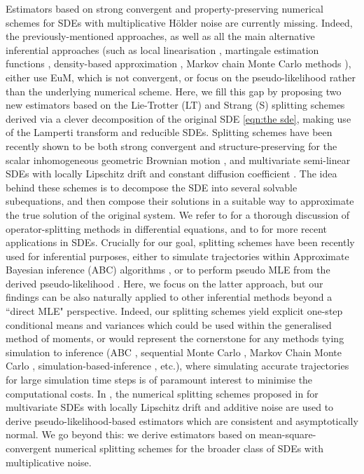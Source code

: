 \documentclass[a4paper,12pt]{article}
\numberwithin{equation}{section}
\theoremstyle{plain}
\theoremstyle{definition}
\begin{document}
Estimators based on strong convergent and property-preserving numerical schemes for SDEs with multiplicative H\"older noise are currently missing. Indeed, the previously-mentioned approaches, as well as all the main alternative inferential approaches (such as local linearisation \cite{Ozaki1985}, martingale estimation functions \cite{bibby_martingale_1995}, density-based approximation \cite{iguchi_closed-form_2025}, Markov chain Monte Carlo methods \cite{Beskosetal2006}), either use EuM, which is not convergent, or focus on the pseudo-likelihood rather than the underlying numerical scheme. Here, we fill this gap by proposing two new estimators based on the
Lie-Trotter (LT) and Strang (S)  splitting schemes derived via a clever  decomposition of the original SDE \eqref{eqn:the sde}, making use of the Lamperti transform and reducible SDEs.  Splitting schemes have been recently shown to be both strong convergent and structure-preserving for the scalar inhomogeneous geometric Brownian motion \cite{tubikanec_qualitative_2022}, and 
multivariate semi-linear SDEs with locally Lipschitz drift and constant  diffusion coefficient \cite{buckwar_splitting_2022}. 
The idea behind these schemes is to decompose 
the SDE into several solvable subequations, and then compose their solutions in a suitable way to approximate the true solution of the original system. We refer to \cite{strang_construction_1968,trotter_product_1959,vovchanskyi_quick_2023} for a thorough discussion of operator-splitting methods in differential equations, and to \cite{buckwar_splitting_2022,foster_high_2024,kelly_adaptive_2023,misawa_numerical_2000,ninomiya_new_2009,tubikanec_qualitative_2022} for more recent applications in SDEs. Crucially for our goal, splitting schemes have been recently used for inferential purposes, either to simulate trajectories within Approximate Bayesian inference (ABC) algorithms \cite{buckwar_spectral_2020,ditlevsen_network_2025,Jovanovskietal2025,STT2025}, or to perform pseudo MLE from the derived pseudo-likelihood \cite{ditlevsen_warning_2023,Huangetal2025,pilipovic_parameter_2024,pilipovic_parameter_2025}. Here, we focus on the latter approach, but  our findings can be also naturally applied to other inferential methods beyond a ``direct MLE" perspective. Indeed, our splitting schemes yield explicit one-step conditional means and variances which could be used within the generalised method of moments, or would represent the cornerstone for any methods tying simulation to inference (ABC 
\cite{sisson2018handbook}, sequential Monte Carlo \cite{del2006sequential}, Markov Chain Monte Carlo \cite{brooks2011handbook}, simulation-based-inference \cite{cranmer2020frontier}, etc.), where simulating accurate trajectories for large simulation time steps is of paramount interest to minimise the computational costs.
 In \cite{pilipovic_parameter_2024},  
the numerical splitting schemes proposed in \cite{buckwar_splitting_2022} for multivariate SDEs with locally Lipschitz drift and additive noise are used to derive pseudo-likelihood-based estimators which are consistent and asymptotically normal.  We go  beyond this: we derive estimators based on mean-square-convergent numerical splitting schemes for the  broader class of  SDEs with multiplicative noise. 
\end{document}
